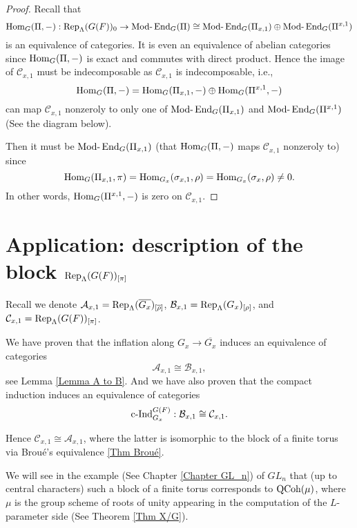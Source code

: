 		\begin{proof}
			Recall that 
			$$\operatorname{\operatorname{Hom}}_G(\Pi, -): \operatorname{\operatorname{Rep}}_{\Lambda}(G(F))_0 \to \operatorname{Mod-}\operatorname{\operatorname{End}}_G(\Pi) \cong \operatorname{Mod-}\operatorname{\operatorname{End}}_G(\Pi_{x,1}) \oplus \operatorname{Mod-}\operatorname{\operatorname{End}}_G(\Pi^{x,1})$$ 
			is an equivalence of categories. It is even an equivalence of abelian categories since $\operatorname{\operatorname{Hom}}_G(\Pi, -)$ is exact and commutes with direct product. Hence the image of $\mathcal{C}_{x,1}$ must be indecomposable as $\mathcal{C}_{x,1}$ is indecomposable, i.e., 
			$$\operatorname{\operatorname{Hom}}_G(\Pi, -)=\operatorname{\operatorname{Hom}}_G(\Pi_{x,1}, -) \oplus \operatorname{\operatorname{Hom}}_G(\Pi^{x,1}, -)$$
			can map $\mathcal{C}_{x,1}$ nonzeroly to only one of $\operatorname{Mod-}\operatorname{\operatorname{End}}_G(\Pi_{x,1})$ and $\operatorname{Mod-}\operatorname{\operatorname{End}}_G(\Pi^{x,1})$ (See the diagram below). 
			
			
			Then it must be $\operatorname{Mod-}\operatorname{\operatorname{End}}_G(\Pi_{x,1})$ (that $\operatorname{\operatorname{Hom}}_G(\Pi, -)$ maps $\mathcal{C}_{x,1}$ nonzeroly to) since 
			$$\operatorname{\operatorname{Hom}}_G(\Pi_{x,1}, \pi)=\operatorname{\operatorname{Hom}}_{G_x}(\sigma_{x,1}, \rho)=\operatorname{\operatorname{Hom}}_{G_x}(\sigma_x, \rho) \neq 0.$$
			In other words, $\operatorname{\operatorname{Hom}}_G(\Pi^{x,1}, -)$ is zero on $\mathcal{C}_{x,1}$.
			
		\end{proof}
		
		
		\section{Application: description of the block $\operatorname{\operatorname{Rep}}_{\Lambda}(G(F))_{[\pi]}$}\label{Section rep application}
		
		Recall we denote $\mathcal{A}_{x,1}=\operatorname{\operatorname{Rep}}_{\Lambda}(\overline{G_x})_{[\overline{\rho}]}$, $\mathcal{B}_{x,1}=\operatorname{\operatorname{Rep}}_{\Lambda}(G_x)_{[\rho]}$, and $\mathcal{C}_{x,1}=\operatorname{\operatorname{Rep}}_{\Lambda}(G(F))_{[\pi]}$.
		
		We have proven that the inflation along $G_x \to \overline{G_x}$ induces an equivalence of categories 
		$$\mathcal{A}_{x,1} \cong \mathcal{B}_{x,1},$$
		see Lemma \ref{Lemma A to B}. And we have also proven that the compact induction induces an equivalence of categories
		$$\operatorname{\operatorname{c-Ind}}_{G_x}^{G(F)}: \mathcal{B}_{x,1} \cong \mathcal{C}_{x,1}.$$
		
		Hence $\mathcal{C}_{x,1} \cong \mathcal{A}_{x,1}$, where the latter is isomorphic to the block of a finite torus via Broué's equivalence \ref{Thm Broué}.
		
		We will see in the example (See Chapter \ref{Chapter GL_n}) of $GL_n$ that (up to central characters) such a block of a finite torus corresponds to $\operatorname{\operatorname{QCoh}}(\mu)$, where $\mu$ is the group scheme of roots of unity appearing in the computation of the $L$-parameter side (See Theorem \ref{Thm X/G}).
		

	